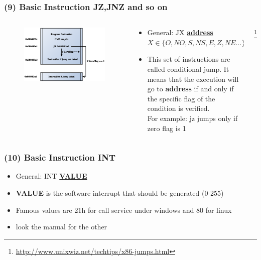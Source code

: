 \documentclass[]{beamer}
\begin{document}
		\begin{frame}
			\frametitle{(9) Basic Instruction JZ,JNZ and so on}
				\begin{columns}
					\begin{column}[left]{2.5in}
						\begin{figure}
							\includegraphics[width=\textwidth]{images/j_unc.eps}									      \label{control}
							\label{Control Flow JZ}
						\end{figure}
					\end{column}
					\begin{column}[right]{2.5in}
						\begin{itemize}
							\item{General: JX \underline{\textbf{address}}}\\
							$ X \in \{O,NO,S,NS,E,Z,NE...\}$\\
							\item{This set of instructions are called conditional jump. It means that the execution will go to \textbf{address} if and only if the specific flag of the condition is verified.\\For example: jz jumps only if zero flag is 1}						\end{itemize}
					\end{column}\footnote{\url{http://www.unixwiz.net/techtips/x86-jumps.html}}

				\end{columns}
		\end{frame}
		\begin{frame}
			\frametitle{(10) Basic Instruction INT}
				\begin{itemize}
					\item{General: INT \underline{\textbf{VALUE}}}\\
					\item{\textbf{VALUE} is the software interrupt that should be generated (0-255)}
					\item{Famous values are 21h for call service under windows and 80 for linux}
					\item{look the manual for the other } 
				\end{itemize}
		\end{frame}
			
\end{document}
